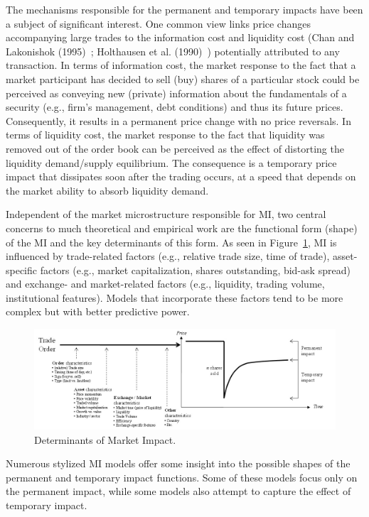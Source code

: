 The mechanisms responsible for the permanent and temporary impacts have been a subject of significant interest. One common view links price changes accompanying large trades to the information cost and liquidity cost (Chan and Lakonishok (1995)~\cite{chan1995}; Holthausen et al. (1990)~\cite{holthausen1990}) potentially attributed to any transaction. In terms of information cost, the market response to the fact that a market participant has decided to sell (buy) shares of a particular stock could be perceived as conveying new (private) information about the fundamentals of a security (e.g., firm's management, debt conditions) and thus its future prices. Consequently, it results in a permanent price change with no price reversals. In terms of liquidity cost, the market response to the fact that liquidity was removed out of the order book can be perceived as the effect of distorting the liquidity demand/supply equilibrium. The consequence is a temporary price impact that dissipates soon after the trading occurs, at a speed that depends on the market ability to absorb liquidity demand.


Independent of the market microstructure responsible for MI, two central concerns to much theoretical and empirical work are the functional form (shape) of the MI and the key determinants of this form. As seen in Figure~\ref{fig:detmarketimpt}, MI is influenced by trade-related factors (e.g., relative trade size, time of trade), asset-specific factors (e.g., market capitalization, shares outstanding, bid-ask spread) and exchange- and market-related factors (e.g., liquidity, trading volume, institutional features). Models that incorporate these factors tend to be more complex but with better predictive power.
	\begin{figure}[!ht]
	\centering
	\includegraphics[width=\textwidth]{chapters/chapter_exec_models/figures/fig2.jpg}
	\caption{Determinants of Market Impact. \label{fig:detmarketimpt}}
	\end{figure}
Numerous stylized MI models offer some insight into the possible shapes of the permanent and temporary impact functions. Some of these models focus only on the permanent impact, while some models also attempt to capture the effect of temporary impact. \\


